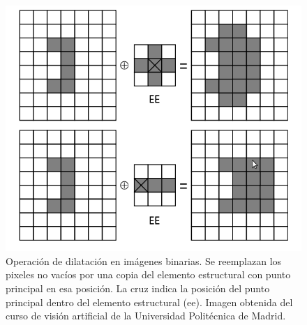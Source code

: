 \begin{figure}[tpb]
\begin{center}
  \includegraphics[scale=0.4]{figuras/dilate-sample.png}
\end{center}
  \caption{\small Operación de dilatación en imágenes binarias. Se reemplazan los pixeles no vacíos por una copia del elemento estructural con punto principal en esa posición. La cruz indica la posición del punto principal dentro del elemento estructural (ee). Imagen obtenida del curso de visión artificial de la Universidad Politécnica de Madrid.}
  \label{fig:dilate-sample}
\end{figure}

